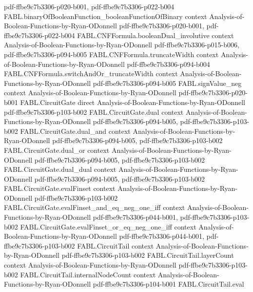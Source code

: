 \begin{theorem}
  {pdf-ffbe9c7b3306-p020-b001,
    pdf-ffbe9c7b3306-p022-b004}
\proofstep
  {FABL.binaryOfBooleanFunction_booleanFunctionOfBinary}
  {context}
  {Analysis-of-Boolean-Functions-by-Ryan-ODonnell}
  {pdf-ffbe9c7b3306-p020-b001,
    pdf-ffbe9c7b3306-p022-b004}
\proofstep
  {FABL.CNFFormula.booleanDual_involutive}
  {context}
  {Analysis-of-Boolean-Functions-by-Ryan-ODonnell}
  {pdf-ffbe9c7b3306-p015-b006,
    pdf-ffbe9c7b3306-p094-b005}
\proofstep
  {FABL.CNFFormula.truncateWidth}
  {context}
  {Analysis-of-Boolean-Functions-by-Ryan-ODonnell}
  {pdf-ffbe9c7b3306-p094-b004}
\proofstep
  {FABL.CNFFormula.switchAndOr_truncateWidth}
  {context}
  {Analysis-of-Boolean-Functions-by-Ryan-ODonnell}
  {pdf-ffbe9c7b3306-p094-b005}
\proofstep
  {FABL.signValue_neg}
  {context}
  {Analysis-of-Boolean-Functions-by-Ryan-ODonnell}
  {pdf-ffbe9c7b3306-p020-b001}
\proofstep
  {FABL.CircuitGate}
  {direct}
  {Analysis-of-Boolean-Functions-by-Ryan-ODonnell}
  {pdf-ffbe9c7b3306-p103-b002}
\proofstep
  {FABL.CircuitGate.dual}
  {context}
  {Analysis-of-Boolean-Functions-by-Ryan-ODonnell}
  {pdf-ffbe9c7b3306-p094-b005,
    pdf-ffbe9c7b3306-p103-b002}
\proofstep
  {FABL.CircuitGate.dual_and}
  {context}
  {Analysis-of-Boolean-Functions-by-Ryan-ODonnell}
  {pdf-ffbe9c7b3306-p094-b005,
    pdf-ffbe9c7b3306-p103-b002}
\proofstep
  {FABL.CircuitGate.dual_or}
  {context}
  {Analysis-of-Boolean-Functions-by-Ryan-ODonnell}
  {pdf-ffbe9c7b3306-p094-b005,
    pdf-ffbe9c7b3306-p103-b002}
\proofstep
  {FABL.CircuitGate.dual_dual}
  {context}
  {Analysis-of-Boolean-Functions-by-Ryan-ODonnell}
  {pdf-ffbe9c7b3306-p094-b005,
    pdf-ffbe9c7b3306-p103-b002}
\proofstep
  {FABL.CircuitGate.evalFinset}
  {context}
  {Analysis-of-Boolean-Functions-by-Ryan-ODonnell}
  {pdf-ffbe9c7b3306-p103-b002}
\proofstep
  {FABL.CircuitGate.evalFinset_and_eq_neg_one_iff}
  {context}
  {Analysis-of-Boolean-Functions-by-Ryan-ODonnell}
  {pdf-ffbe9c7b3306-p044-b001,
    pdf-ffbe9c7b3306-p103-b002}
\proofstep
  {FABL.CircuitGate.evalFinset_or_eq_neg_one_iff}
  {context}
  {Analysis-of-Boolean-Functions-by-Ryan-ODonnell}
  {pdf-ffbe9c7b3306-p044-b001,
    pdf-ffbe9c7b3306-p103-b002}
\proofstep
  {FABL.CircuitTail}
  {context}
  {Analysis-of-Boolean-Functions-by-Ryan-ODonnell}
  {pdf-ffbe9c7b3306-p103-b002}
\proofstep
  {FABL.CircuitTail.layerCount}
  {context}
  {Analysis-of-Boolean-Functions-by-Ryan-ODonnell}
  {pdf-ffbe9c7b3306-p103-b002}
\proofstep
  {FABL.CircuitTail.internalNodeCount}
  {context}
  {Analysis-of-Boolean-Functions-by-Ryan-ODonnell}
  {pdf-ffbe9c7b3306-p104-b001}
\proofstep
  {FABL.CircuitTail.eval}

\end{theorem}
